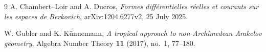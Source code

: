 \documentclass[11pt]{article}
\begin{document}



\begin{thebibliography}{9}
A. Chambert--Loir and A. Ducros,
\emph{Formes diff\'erentielles r\'eelles et courants sur les espaces de
Berkovich}, arXiv:1204.6277v2, 25 July 2025.

W. Gubler and K. K\"unnemann,
\emph{A tropical approach to non-Archimedean Arakelov geometry},
Algebra Number Theory \textbf{11} (2017), no.~1, 77--180.
\end{thebibliography}
\end{document}
